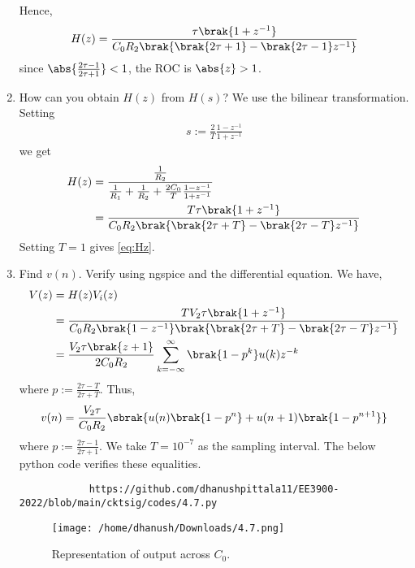 \documentclass[journal,12pt,twocolumn]{IEEEtran}
\renewcommand\thesection{\arabic{section}}
\begin{document}
\begin{enumerate}[label=\arabic*.,ref=\thesection.\theenumi]
		Hence,
		\begin{align}
			H(z) = \frac{\tau\brak{1+z^{-1}}}{C_0R_2\brak{\brak{2\tau+1}-\brak{2\tau-1}z^{-1}}}
			\label{eq:Hz}
		\end{align}
		since $\abs{\frac{2\tau-1}{2\tau+1}} < 1$, the ROC is $\abs{z} > 1$.
		\item How can you obtain $H(z)$ from $H(s)$?
		\solution We use the bilinear transformation. Setting
		\begin{align}
			s := \frac{2}{T}\frac{1 - z^{-1}}{1 + z^{-1}}
		\end{align}
		we get
		\begin{align}
			H(z) &= \frac{\frac{1}{R_2}}{\frac{1}{R_1} + \frac{1}{R_2} + \frac{2C_0}{T}\frac{1 - z^{-1}}{1 + z^{-1}}} \\
			&= \frac{T\tau\brak{1+z^{-1}}}{C_0R_2\brak{\brak{2\tau+T}-\brak{2\tau-T}z^{-1}}}
		\end{align}
		Setting $T = 1$ gives \eqref{eq:Hz}.
		\item Find $v(n)$. Verify using ngspice and the differential equation.
		\solution We have,
		\begin{align}
			V(z) &= H(z)V_i(z) \\
			&= \frac{TV_2\tau\brak{1+z^{-1}}}{C_0R_2\brak{1-z^{-1}}\brak{\brak{2\tau+T}-\brak{2\tau-T}z^{-1}}} \\
			&= \frac{V_2\tau\brak{z+1}}{2C_0R_2}\sum_{k=-\infty}^{\infty}\brak{1-p^k}u(k)z^{-k}
		\end{align}
		where $p := \frac{2\tau-T}{2\tau+T}$. Thus,
		\begin{align}
			v(n) = \frac{V_2\tau}{C_0R_2}\sbrak{u(n)\brak{1-p^n}+u(n+1)\brak{1-p^{n+1}}}
		\end{align}
		where $p := \frac{2\tau-1}{2\tau+1}$. We take $T = 10^{-7}$ as the
		sampling interval. The below python code verifies
		these equalities.
		\begin{lstlisting}
			https://github.com/dhanushpittala11/EE3900-2022/blob/main/cktsig/codes/4.7.py
		\end{lstlisting}
		\begin{figure}
			\texttt{[image: /home/dhanush/Downloads/4.7.png]}
			\caption{Representation of output across $C_0$.}
			\label{fig:vc0}
		\end{figure}
	\end{enumerate}
\end{document}
